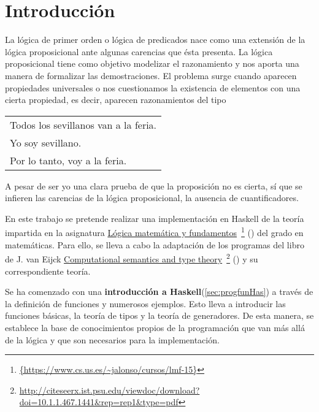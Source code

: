 \chapter*{Introducción}

La lógica de primer orden o lógica de predicados nace como una extensión de la
lógica proposicional ante algunas carencias que ésta presenta. La lógica
proposicional tiene como objetivo modelizar el razonamiento y nos aporta una
manera de formalizar las demostraciones. El problema surge cuando aparecen
propiedades universales o nos cuestionamos la existencia de elementos con una
cierta propiedad, es decir, aparecen razonamientos del tipo
\begin{center}
\begin{tabular}{l}
  Todos los sevillanos van a la feria. \\
  Yo soy sevillano.\\
  Por lo tanto, voy a la feria.
\end{tabular}
\end{center}
A pesar de ser yo una clara prueba de que la proposición no es cierta, sí que
se infieren las carencias de la lógica proposicional, la ausencia de
cuantificadores.

\vspace{4mm}

En este trabajo se pretende realizar una implementación en Haskell de la teoría
impartida en la asignatura
\href{https://www.cs.us.es/~jalonso/cursos/lmf-15}{Lógica matemática y
  fundamentos}\ \footnote{\url{{https://www.cs.us.es/~jalonso/cursos/lmf-15}}}
(\cite{Alonso-15a}) del grado en matemáticas.  Para ello, se lleva a cabo la
adaptación de los programas del libro de J. van Eijck
\href{http://citeseerx.ist.psu.edu/viewdoc/download?doi=10.1.1.467.1441&rep=rep1&type=pdf}
{Computational semantics and type theory}\
\footnote{\url{http://citeseerx.ist.psu.edu/viewdoc/download?doi=10.1.1.467.1441&rep=rep1&type=pdf}}
(\cite{Eijck-03}) y su correspondiente teoría.

\vspace{3mm}

Se ha comenzado con una \textbf{introducción a Haskell}(\ref{sec:progfunHas}) a
través de la definición de funciones y numerosos ejemplos. Esto lleva a
introducir las funciones básicas, la teoría de tipos y la teoría de
generadores. De esta manera, se establece la base de conocimientos propios de
la programación que van más allá de la lógica y que son necesarios para la
implementación.

